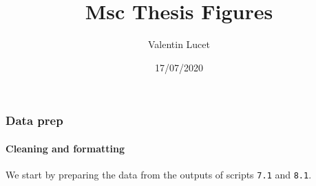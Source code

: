 \documentclass[
]{article}
\title{Msc Thesis Figures}
\author{Valentin Lucet}
\date{17/07/2020}
\begin{document}
\maketitle

\hypertarget{data-prep}{%
\subsubsection{Data prep}\label{data-prep}}

\hypertarget{cleaning-and-formatting}{%
\paragraph{Cleaning and formatting}\label{cleaning-and-formatting}}

We start by preparing the data from the outputs of scripts \texttt{7.1}
and \texttt{8.1}.
\end{document}
